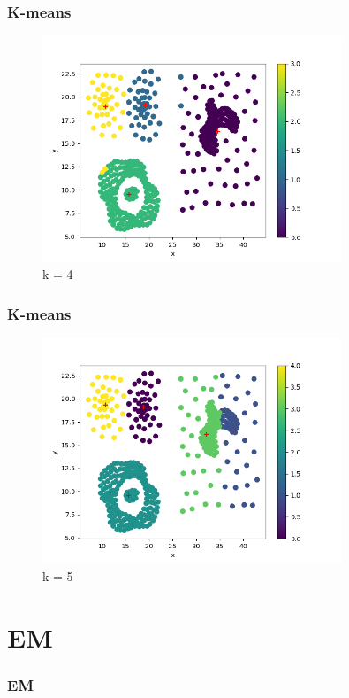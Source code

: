 \documentclass[xcolor={usenames,dvipsnames}, 
	hyperref={
	colorlinks=true, 						%
	linkcolor=black, 						%
	urlcolor=black,							%
	citecolor=black,						%
	pdfpagelabels=false,
	},
	ignorenonframetext,			%
	compress					%
]{beamer}
\begin{document}
\begin{frame}
   \frametitle{K-means}
\begin{figure}[ht!]
\caption{k = 4}
\centering
\includegraphics[width=0.8\textwidth]{plots/k_mean_9.png}
\end{figure}
\end{frame}

\begin{frame}
   \frametitle{K-means}
\begin{figure}[ht!]
\caption{k = 5}
\centering
\includegraphics[width=0.8\textwidth]{plots/k_mean_10.png}
\end{figure}
\end{frame}


\section{EM}
\begin{frame}
   \frametitle{EM}

\end{frame}
\end{document}
